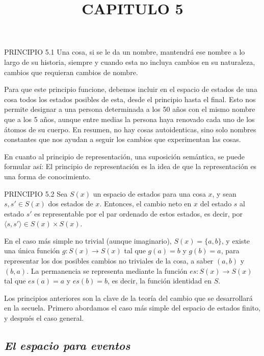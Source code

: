 \begin{justifying}
	\bigskip

	\noindent PRINCIPIO 5.1 Una cosa, si se le da un nombre, mantendrá ese nombre a lo largo de su
	historia, siempre y cuando esta no incluya cambios en su naturaleza,
	cambios que requieran cambios de nombre.

	Para que este principio funcione, debemos incluir en el espacio de estados de
	una cosa todos los estados posibles de esta, desde el principio hasta el final. Esto
	nos permite designar a una persona determinada a los 50 años con el mismo nombre que a los
	5 años, aunque entre medias la persona haya renovado cada uno de los
	átomos de su cuerpo. En resumen, no hay cosas autoidenticas, sino solo
	nombres constantes que nos ayudan a seguir los cambios que experimentan
	las cosas.

	En cuanto al principio de representación, una suposición semántica, se puede formular así:
	El principio de representación es la idea de que la representación es una forma de conocimiento.

	\newpage

	\begin{center}
		\title{\normalsize CAPITULO 5}
	\end{center}

	\noindent PRINCIPIO 5.2 Sea $S(x)$ un espacio de estados para una cosa $x$, y sean $s, s' \in S(x)$
	dos estados de $x$. Entonces, el cambio neto en $x$ del estado $s$ al estado $s'$ es
	representable por el par ordenado de estos estados, es decir, por $\langle s, s' \rangle \in
	S(x) \times S(x)$.

	En el caso más simple no trivial (aunque imaginario), $S(x) = \{a, b\}$, y existe
	una única función $g: S(x) \to S(x)$ tal que $g(a)=b$ y $g(b)=a$, para representar los dos posibles cambios no triviales de la cosa, a saber $(a, b)$
	y $(b, a)$. La permanencia se representa mediante la función $es: S(x) \to S(x)$
	tal que $es(a) = a$ y $es(b) = b$, es decir, la función identidad en $S$.

	Los principios anteriores son la clave de la teoría del cambio que se desarrollará en
	la secuela. Primero abordamos el caso más simple del espacio de estados finito,
	y después el caso general.

	\bigskip

	\subsection{\textit{El espacio para eventos}}


\end{justifying}
